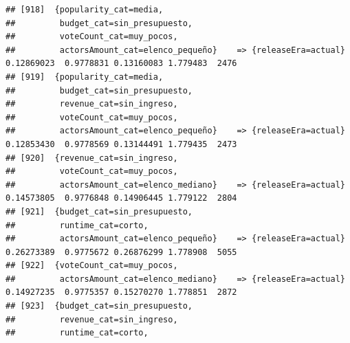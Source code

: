 \documentclass[
]{article}
\begin{document}
\begin{verbatim}
## [918]  {popularity_cat=media,                                                                                                   
##         budget_cat=sin_presupuesto,                                                                                             
##         voteCount_cat=muy_pocos,                                                                                                
##         actorsAmount_cat=elenco_pequeño}    => {releaseEra=actual}               0.12869023  0.9778831 0.13160083 1.779483  2476
## [919]  {popularity_cat=media,                                                                                                   
##         budget_cat=sin_presupuesto,                                                                                             
##         revenue_cat=sin_ingreso,                                                                                                
##         voteCount_cat=muy_pocos,                                                                                                
##         actorsAmount_cat=elenco_pequeño}    => {releaseEra=actual}               0.12853430  0.9778569 0.13144491 1.779435  2473
## [920]  {revenue_cat=sin_ingreso,                                                                                                
##         voteCount_cat=muy_pocos,                                                                                                
##         actorsAmount_cat=elenco_mediano}    => {releaseEra=actual}               0.14573805  0.9776848 0.14906445 1.779122  2804
## [921]  {budget_cat=sin_presupuesto,                                                                                             
##         runtime_cat=corto,                                                                                                      
##         actorsAmount_cat=elenco_pequeño}    => {releaseEra=actual}               0.26273389  0.9775672 0.26876299 1.778908  5055
## [922]  {voteCount_cat=muy_pocos,                                                                                                
##         actorsAmount_cat=elenco_mediano}    => {releaseEra=actual}               0.14927235  0.9775357 0.15270270 1.778851  2872
## [923]  {budget_cat=sin_presupuesto,                                                                                             
##         revenue_cat=sin_ingreso,                                                                                                
##         runtime_cat=corto,                                                                                                      

\end{verbatim}
\end{document}
